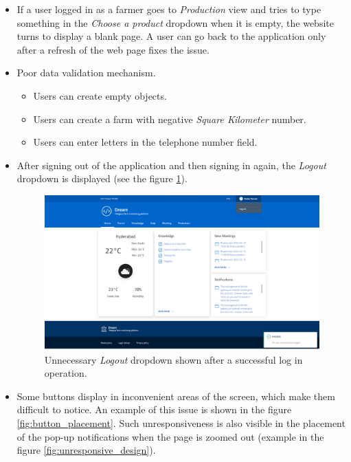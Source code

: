 \begin{itemize}
    \item If a user logged in as a farmer goes to \textit{Production} view and tries to type something in the \textit{Choose a product} dropdown when it is empty, the website turns to display a blank page. A user can go back to the application only after a refresh of the web page fixes the issue.
    \item Poor data validation mechanism.
    \begin{itemize}
        \item Users can create empty objects. 
        \item Users can create a farm with negative \textit{Square Kilometer} number.
        \item Users can enter letters in the telephone number field.
    \end{itemize}
    \item After signing out of the application and then signing in again, the \textit{Logout} dropdown is displayed (see the figure \ref{fig:logout_dropdown}).
    
    \begin{figure}[H]
        \centering
        \includegraphics[width=\textwidth]{figures/farmers_home_page_log_out_dropdown.png}
        \caption{Unnecessary \textit{Logout} dropdown shown after a successful log in operation.}
        \label{fig:logout_dropdown}
    \end{figure}

    \item Some buttons display in inconvenient areas of the screen, which make them difficult to notice. An example of this issue is shown in the figure \ref{fig:button_placement}. Such unresponsiveness is also visible in the placement of the pop-up notifications when the page is zoomed out (example in the figure \ref{fig:unresponsive_design}).
    

\end{itemize}
